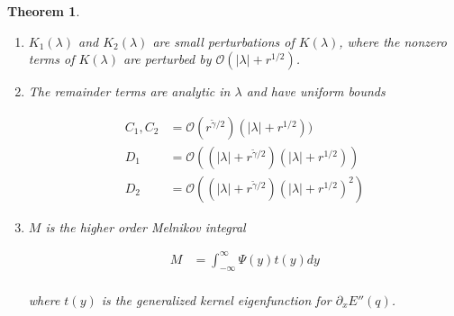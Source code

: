 \documentclass[12pt]{article}
\newtheorem{theorem}{Theorem}
\begin{document}
\begin{theorem}
\begin{enumerate}
\begin{align}\label{Asymm}
A &= \begin{pmatrix}
-a_0 -a_1 & a_0 + a_1 \\
a_0 + a_1 & -a_0 - a_1
\end{pmatrix} && n = 2 \\
A &= \begin{pmatrix}
-a_{n-1} - a_0 & a_0 & & &  & a_{n-1}\\
a_0 & -a_0 - a_1 &  a_1 \\
& a_1 & -a_1 - a_2 &  a_2 \\
& \ddots & \ddots & \ddots \\
a_{n-1} & & & & a_{n-2} & -a_{n-2} - a_{n-1} \\
\end{pmatrix} && n > 2 \nonumber
\end{align}

where

\begin{align*}
a_i &= \langle \Psi(X_i), Q'(-X_i) \rangle \\
\end{align*}

$\Psi(x)$ is the exponentially localized solution to the adjoint variational equation \eqref{adjvareq2} defined in Lemma \ref{varadjsolutions}. $Q(x) = (q(x), \partial_x q(x), \dots, \partial_x^{2m}q(x))$, where $q(x)$ is the symmetric primary pulse solution from Hypothesis \ref{Qexistshyp}.\\

\item $K_1(\lambda)$ and $K_2(\lambda)$ are small perturbations of $K(\lambda)$, where the nonzero terms of $K(\lambda)$ are perturbed by $\mathcal{O}(|\lambda| + r^{1/2})$.

\item The remainder terms are analytic in $\lambda$ and have uniform bounds

\begin{align*}
C_1, C_2 &= \mathcal{O}(r^{\tilde{\gamma}/2})(|\lambda| + r^{1/2})) \\
D_1 &= \mathcal{O}((|\lambda| + r^{\tilde{\gamma}/2})(|\lambda| + r^{1/2})) \\
D_2 &= \mathcal{O}((|\lambda| + r^{\tilde{\gamma}/2})(|\lambda| + r^{1/2})^2)
\end{align*}

\item $M$ is the higher order Melnikov integral

\begin{align*}
M &= \int_{-\infty}^\infty \Psi(y) t(y) dy \\
\end{align*}

where $t(y)$ is the generalized kernel eigenfunction for $\partial_x E''(q)$.
\end{enumerate}
\end{theorem}
\end{document}

